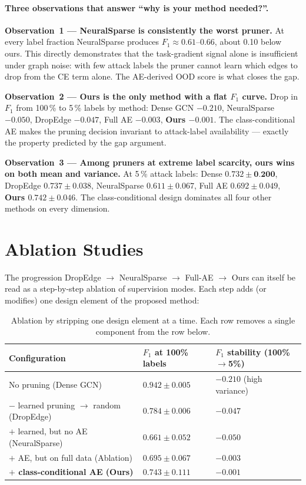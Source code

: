 \documentclass[11pt,a4paper]{report}
\theoremstyle{definition}
\theoremstyle{remark}
\begin{document}
\paragraph{Three observations that answer ``why is your method needed?''.}

\textbf{Observation~1 --- NeuralSparse is consistently the worst pruner.}
At every label fraction NeuralSparse produces $F_1\approx 0.61$--$0.66$,
about 0.10 below ours. This directly demonstrates that the task-gradient
signal alone is insufficient under graph noise: with few attack labels
the pruner cannot learn which edges to drop from the CE term alone. The
AE-derived OOD score is what closes the gap.

\textbf{Observation~2 --- Ours is the only method with a flat $F_1$
curve.} Drop in $F_1$ from 100\,\% to 5\,\% labels by method:
Dense GCN $-0.210$, NeuralSparse $-0.050$, DropEdge $-0.047$,
Full AE $-0.003$, \textbf{Ours $-0.001$}. The class-conditional AE makes
the pruning decision invariant to attack-label availability --- exactly
the property predicted by the gap argument.

\textbf{Observation~3 --- Among pruners at extreme label scarcity, ours
wins on both mean and variance.} At 5\,\% attack labels:
Dense $0.732\pm\textbf{0.200}$, DropEdge $0.737\pm 0.038$,
NeuralSparse $0.611\pm 0.067$, Full AE $0.692\pm 0.049$,
\textbf{Ours $0.742\pm 0.046$}. The class-conditional design dominates
all four other methods on every dimension.

\section{Ablation Studies}
\label{sec:ablation}

The progression DropEdge $\to$ NeuralSparse $\to$ Full-AE $\to$ Ours can
itself be read as a step-by-step ablation of supervision modes. Each
step adds (or modifies) one design element of the proposed method:

\begin{table}[h]
\centering
\caption{Ablation by stripping one design element at a time. Each row
removes a single component from the row below.}
\label{tab:ablation}
\small
\begin{tabular}{p{4.5cm}p{4cm}p{4cm}}
\toprule
\textbf{Configuration} & \textbf{$F_1$ at 100\% labels}
& \textbf{$F_1$ stability (100\%$\to$5\%)} \\
\midrule
No pruning (Dense GCN) & $0.942\pm 0.005$ & $-0.210$ (high variance) \\
$-$ learned pruning $\to$ random (DropEdge) & $0.784\pm 0.006$ & $-0.047$ \\
$+$ learned, but no AE (NeuralSparse) & $0.661\pm 0.052$ & $-0.050$ \\
$+$ AE, but on full data (Ablation) & $0.695\pm 0.067$ & $-0.003$ \\
\textbf{$+$ class-conditional AE (Ours)} & $\bm{0.743\pm 0.111}$
& $\bm{-0.001}$ \\
\bottomrule
\end{tabular}
\end{table}
\end{document}
